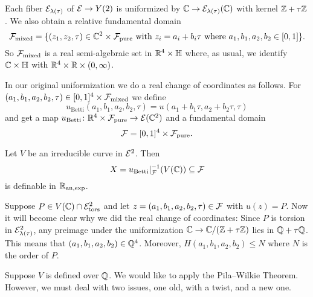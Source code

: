 Each fiber ${\mathcal E}_{\lambda(\tau)}$ of ${\mathcal E}\rightarrow Y(2)$ is
uniformized by ${\mathbb{C}}\rightarrow {\mathcal E}_{\lambda(\tau)}({\mathbb{C}})$ with kernel
${\mathbb{Z}}+\tau{\mathbb{Z}}$.
We also obtain a relative fundamental domain
\begin{equation*}
  {\mathcal F}_{\mathrm{mixed}} = \{(z_1,z_2,\tau) \in
  {\mathbb{C}}^2\times {\mathcal F}_{\mathrm{pure}} \text{ with }z_i=a_i+b_i\tau\text{
    where }a_1,b_1,a_2,b_2\in [0,1]  \}. 
\end{equation*}
So ${\mathcal F}_{\mathrm{mixed}}$
is a real semi-algebraic set in ${\mathbb{R}}^4\times {\mathbb{H}}$ where, as
usual, we identify ${\mathbb{C}}\times {\mathbb{H}}$ with ${\mathbb{R}}^4\times{\mathbb{R}}\times(0,\infty)$.

In our original uniformization we do a real change of coordinates as
follows. 
For $(a_1,b_1,a_2,b_2,\tau)\in [0,1]^4\times {\mathcal F}_{\mathrm{mixed}}$ we define
\begin{equation*}
   u_{\mathrm{Betti}}(a_1,b_1,a_2,b_2,\tau) = u(a_1+b_1\tau,a_2+b_2\tau,\tau)
\end{equation*}
and get a map $u_{\mathrm{Betti}}\colon {\mathbb{R}}^4\times {\mathcal F}_{\mathrm{pure}}\rightarrow{\mathcal E}({\mathbb{C}}^2)$
and a fundamental domain 
\begin{equation*}
  {\mathcal F} = [0,1]^4\times {\mathcal F}_{\mathrm{pure}}. 
\end{equation*}

Let $V$ be an irreducible curve in ${\mathcal E}^2$. Then
\begin{equation*}
  X = u_{\mathrm{Betti}}|_{{\mathcal F}}^{-1}(V({\mathbb{C}})) \subseteq {\mathcal F}
\end{equation*}
is definable in ${{\mathbb{R}}_{\mathrm{an,exp}}}$.


Suppose $P\in V({\mathbb{C}})\cap{\mathcal E}_{\mathrm{tors}}^2$ and let
$z=(a_1,b_1,a_2,b_2,\tau)\in {\mathcal F}$ with $u(z)=P$.
Now it will become clear why we did the real change of coordinates:
Since $P$ is torsion in ${\mathcal E}^2_{\lambda(\tau)}$, any preimage under
the
uniformization ${\mathbb{C}}\rightarrow {\mathbb{C}}/({\mathbb{Z}}+\tau{\mathbb{Z}})$ lies in
${\mathbb{Q}}+\tau{\mathbb{Q}}$. This means that $(a_1,b_1,a_2,b_2)\in {\mathbb{Q}}^4$. Moreover,
$H(a_1,b_1,a_2,b_2)\le N$ where $N$ is the order of $P$. 

Suppose $V$ is defined over ${\mathbb{Q}}$. 
We would like to apply the Pila--Wilkie Theorem. However, we must deal
with two issues, one old, with a twist, and a new one.

